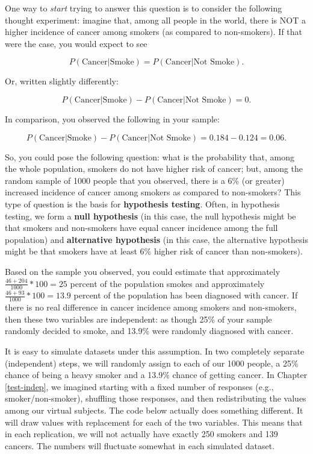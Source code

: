 \documentclass[openany]{book}
\begin{document}
One way to \emph{start} trying to answer this question is to consider the following thought experiment: imagine that, among all people in the world, there is NOT a higher incidence of cancer among smokers (as compared to non-smokers). If that were the case, you would expect to see

\[P(\text{Cancer}|\text{Smoke})=P(\text{Cancer}|\text{Not Smoke}).\]

Or, written slightly differently:

\[P(\text{Cancer}|\text{Smoke})-P(\text{Cancer}|\text{Not Smoke})=0.\]

In comparison, you observed the following in your sample:

\[P(\text{Cancer}|\text{Smoke})-P(\text{Cancer}|\text{Not Smoke})=0.184-0.124=0.06.\]

So, you could pose the following question: what is the probability that, among the whole population, smokers do not have higher risk of cancer; but, among the random sample of 1000 people that you observed, there is a 6\% (or greater) increased incidence of cancer among smokers as compared to non-smokers? This type of question is the basis for \textbf{hypothesis testing}. Often, in hypothesis testing, we form a \textbf{null hypothesis} (in this case, the null hypothesis might be that smokers and non-smokers have equal cancer incidence among the full population) and \textbf{alternative hypothesis} (in this case, the alternative hypothesis might be that smokers have at least 6\% higher risk of cancer than non-smokers).

Based on the sample you observed, you could estimate that approximately \(\frac{46+204}{1000}*100=25\) percent of the population smokes and approximately \(\frac{46+93}{1000}*100=13.9\) percent of the population has been diagnosed with cancer. If there is no real difference in cancer incidence among smokers and non-smokers, then these two variables are independent: as though 25\% of your sample randomly decided to smoke, and 13.9\% were randomly diagnosed with cancer.

It is easy to simulate datasets under this assumption. In two completely separate (independent) steps, we will randomly assign to each of our 1000 people, a 25\% chance of being a heavy smoker and a 13.9\% chance of getting cancer. In Chapter \ref{test-indep}, we imagined starting with a fixed number of responses (e.g., smoker/non-smoker), shuffling those responses, and then redistributing the values among our virtual subjects. The code below actually does something different. It will draw values with replacement for each of the two variables. This means that in each replication, we will not actually have exactly 250 smokers and 139 cancers. The numbers will fluctuate somewhat in each simulated dataset.
\end{document}
